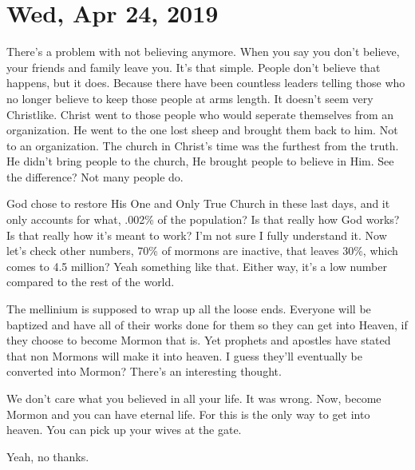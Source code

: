 \section{Wed, Apr 24, 2019}

There's a problem with not believing anymore. When you say you don't believe, 
your friends and family leave you. It's that simple. People don't believe that 
happens, but it does. Because there have been countless leaders telling those 
who no longer believe to keep those people at arms length. It doesn't seem very 
Christlike. Christ went to those people who would seperate themselves from an 
organization. He went to the one lost sheep and brought them back to him. Not to 
an organization. The church in Christ's time was the furthest from the truth. He 
didn't bring people to the church, He brought people to believe in Him. See the 
difference? Not many people do.

God chose to restore His One and Only True Church in these last days, and it 
only accounts for what, .002\% of the population? Is that really how God works? Is that 
really how it's meant to work? I'm not sure I fully understand it. Now let's 
check other numbers, 70\% of mormons are inactive, that leaves 30\%, which comes 
to 4.5 million? Yeah something like that. Either way, it's a low number compared 
to the rest of the world.

The mellinium is supposed to wrap up all the loose ends. Everyone will be 
baptized and have all of their works done for them so they can get into Heaven, 
if they choose to become Mormon that is. Yet prophets and apostles have stated 
that non Mormons will make it into heaven. I guess they'll eventually be 
converted into Mormon? There's an interesting thought.

We don't care what you believed in all your life. It was wrong. Now, become 
Mormon and you can have eternal life. For this is the only way to get into 
heaven. You can pick up your wives at the gate.

Yeah, no thanks.

